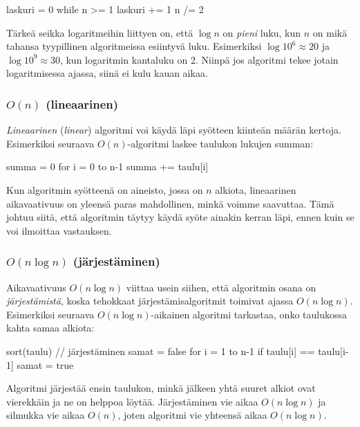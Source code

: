 \begin{code}
    laskuri = 0
    while n >= 1
    laskuri += 1
    n /= 2
\end{code}


Tärkeä seikka logaritmeihin liittyen on, että
$\log n$ on \emph{pieni} luku, kun $n$ on mikä tahansa
tyypillinen algoritmeissa esiintyvä luku.
Esimerkiksi $\log 10^6 \approx 20$ ja $\log 10^9 \approx 30$,
kun logaritmin kantaluku on 2.
Niinpä jos algoritmi tekee jotain logaritmisessa ajassa,
siinä ei kulu kauan aikaa.


\subsubsection{$O(n)$ (lineaarinen)}

\emph{Lineaarinen} (\emph{linear}) algoritmi voi käydä läpi syötteen kiinteän määrän kertoja.
Esimerkiksi seuraava $O(n)$-algoritmi laskee taulukon lukujen summan:

\begin{code}
    summa = 0
    for i = 0 to n-1
    summa += taulu[i]
\end{code}

Kun algoritmin syötteenä on aineisto, jossa on $n$ alkiota,
lineaarinen aikavaativuus on yleensä paras mahdollinen,
minkä voimme saavuttaa.
Tämä johtuu siitä, että algoritmin täytyy käydä syöte
ainakin kerran läpi, ennen kuin se voi ilmoittaa vastauksen.

\subsubsection{$O(n \log n)$ (järjestäminen)}

Aikavaativuus $O(n \log n)$ viittaa usein siihen,
että algoritmin osana on \emph{järjes\-tämistä},
koska tehokkaat järjestämisalgoritmit
toimivat ajassa $O(n \log n)$.
Esimerkiksi seuraava $O(n \log n)$-aikainen
algoritmi tarkastaa, onko taulukossa kahta samaa alkiota:

\begin{code}
    sort(taulu) // järjestäminen
    samat = false
    for i = 1 to n-1
    if taulu[i] == taulu[i-1]
    samat = true
\end{code}

Algoritmi järjestää ensin taulukon, minkä jälkeen yhtä
suuret alkiot ovat vierekkäin ja ne on helppoa löytää.
Järjestäminen vie aikaa $O(n \log n)$
ja silmukka vie aikaa $O(n)$, joten algoritmi vie
yhteensä aikaa $O(n \log n)$.

